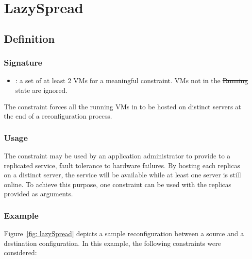\section{LazySpread}
\subsection{Definition}

\subsubsection{Signature} 

\begin{itemize}
\item {} : a set of at least 2 VMs for a meaningful constraint. VMs not in the \st{Running} state are ignored.
\end{itemize}

The  constraint forces all the running VMs in  to be hosted on distinct servers at the end of a reconfiguration process.


\subsubsection{Usage}

The  constraint may be used by an application administrator to provide to a replicated service, fault tolerance to hardware failures. By hosting each replicas on a distinct server, the service will  be
available while at least one server is still online. To achieve this purpose, one  constraint can
be used with the replicas provided as arguments.

\subsubsection{Example}

Figure~\ref{fig: lazySpread} depicts a sample reconfiguration between a source and a destination
configuration. In this example, the following  constraints were considered:


